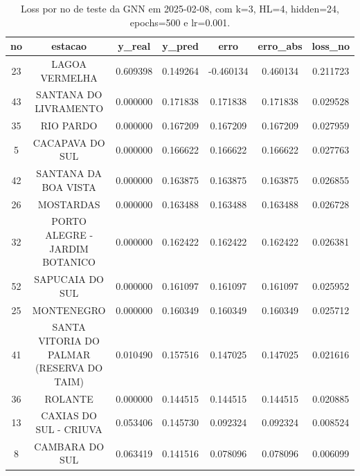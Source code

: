 \begin{table}[h]
\centering
\caption{Loss por no de teste da GNN em 2025-02-08, com k=3, HL=4, hidden=24, epochs=500 e lr=0.001.}
\label{tab:gnn_loss_k3_hl4_h24_e500_d20250208}
\begin{tabular}{ccccccc}
\toprule
no & estacao & y\_real & y\_pred & erro & erro\_abs & loss\_no \\
\midrule
23 & LAGOA VERMELHA & 0.609398 & 0.149264 & -0.460134 & 0.460134 & 0.211723 \\
43 & SANTANA DO LIVRAMENTO & 0.000000 & 0.171838 & 0.171838 & 0.171838 & 0.029528 \\
35 & RIO PARDO & 0.000000 & 0.167209 & 0.167209 & 0.167209 & 0.027959 \\
5 & CACAPAVA DO SUL & 0.000000 & 0.166622 & 0.166622 & 0.166622 & 0.027763 \\
42 & SANTANA DA BOA VISTA & 0.000000 & 0.163875 & 0.163875 & 0.163875 & 0.026855 \\
26 & MOSTARDAS & 0.000000 & 0.163488 & 0.163488 & 0.163488 & 0.026728 \\
32 & PORTO ALEGRE - JARDIM BOTANICO & 0.000000 & 0.162422 & 0.162422 & 0.162422 & 0.026381 \\
52 & SAPUCAIA DO SUL & 0.000000 & 0.161097 & 0.161097 & 0.161097 & 0.025952 \\
25 & MONTENEGRO & 0.000000 & 0.160349 & 0.160349 & 0.160349 & 0.025712 \\
41 & SANTA VITORIA DO PALMAR (RESERVA DO TAIM) & 0.010490 & 0.157516 & 0.147025 & 0.147025 & 0.021616 \\
36 & ROLANTE & 0.000000 & 0.144515 & 0.144515 & 0.144515 & 0.020885 \\
13 & CAXIAS DO SUL - CRIUVA & 0.053406 & 0.145730 & 0.092324 & 0.092324 & 0.008524 \\
8 & CAMBARA DO SUL & 0.063419 & 0.141516 & 0.078096 & 0.078096 & 0.006099 \\
\bottomrule
\end{tabular}
\end{table}
